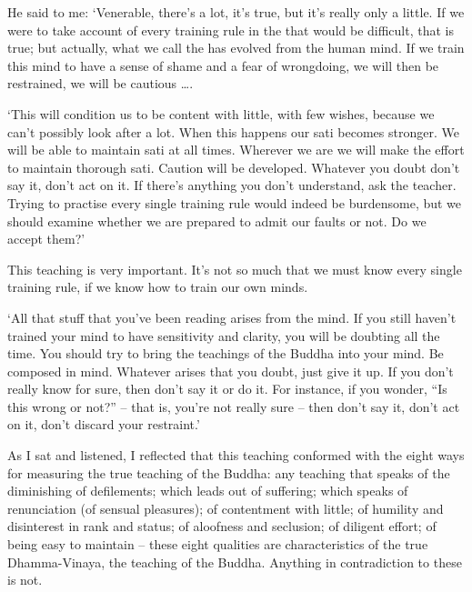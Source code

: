 He said to me: `Venerable, there's a lot, it's true, but it's really only a little. If we were to take account of every training rule in the  that would be difficult, that is true; but actually, what we call the  has evolved from the human mind. If we train this mind to have a sense of shame and a fear of wrongdoing, we will then be restrained, we will be cautious \ldots{}.

`This will condition us to be content with little, with few wishes, because we can't possibly look after a lot. When this happens our sati becomes stronger. We will be able to maintain sati at all times. Wherever we are we will make the effort to maintain thorough sati. Caution will be developed. Whatever you doubt don't say it, don't act on it. If there's anything you don't understand, ask the teacher. Trying to practise every single training rule would indeed be burdensome, but we should examine whether we are prepared to admit our faults or not. Do we accept them?' 

This teaching is very important. It's not so much that we must know every single training rule, if we know how to train our own minds.  

`All that stuff that you've been reading arises from the mind. If you still haven't trained your mind to have sensitivity and clarity, you will be doubting all the time. You should try to bring the teachings of the Buddha into your mind. Be composed in mind. Whatever arises that you doubt, just give it up. If you don't really know for sure, then don't say it or do it. For instance, if you wonder, ``Is this wrong or not?'' -- that is, you're not really sure -- then don't say it, don't act on it, don't discard your restraint.' 

As I sat and listened, I reflected that this teaching conformed with the eight ways for measuring the true teaching of the Buddha: any teaching that speaks of the diminishing of defilements; which leads out of suffering; which speaks of renunciation (of sensual pleasures); of contentment with little; of humility and disinterest in rank and status; of aloofness and seclusion; of diligent effort; of being easy to maintain -- these eight qualities are characteristics of the true Dhamma-Vinaya, the teaching of the Buddha. Anything in contradiction to these is not. 

